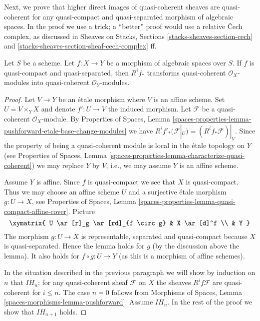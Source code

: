 \medskip\noindent
Next, we prove that higher direct images of quasi-coherent sheaves are
quasi-coherent for any quasi-compact and quasi-separated morphism of
algebraic spaces. In the proof we use a trick; a ``better'' proof would
use a relative {\v C}ech complex, as discussed in
Sheaves on Stacks, Sections \ref{stacks-sheaves-section-cech} and
\ref{stacks-sheaves-section-sheaf-cech-complex} ff.

\begin{lemma}
\label{lemma-higher-direct-image}
Let $S$ be a scheme. Let $f : X \to Y$ be a morphism of algebraic spaces
over $S$. If $f$ is quasi-compact and quasi-separated, then $R^if_*$
transforms quasi-coherent $\mathcal{O}_X$-modules into
quasi-coherent $\mathcal{O}_Y$-modules.
\end{lemma}

\begin{proof}
Let $V \to Y$ be an \'etale morphism where $V$ is an affine scheme. Set
$U = V \times_Y X$ and denote $f' : U \to V$ the induced morphism.
Let $\mathcal{F}$ be a quasi-coherent $\mathcal{O}_X$-module. By
Properties of Spaces, Lemma
\ref{spaces-properties-lemma-pushforward-etale-base-change-modules}
we have
$R^if'_*(\mathcal{F}|_U) = (R^if_*\mathcal{F})|_V$.
Since the property of being a quasi-coherent module is local in the
\'etale topology on $Y$ (see
Properties of Spaces, Lemma
\ref{spaces-properties-lemma-characterize-quasi-coherent})
we may replace $Y$ by $V$, i.e., we may assume $Y$ is an affine scheme.

\medskip\noindent
Assume $Y$ is affine. Since $f$ is quasi-compact we see that $X$
is quasi-compact. Thus we may choose an affine scheme $U$ and a surjective
\'etale morphism $g : U \to X$, see
Properties of Spaces,
Lemma \ref{spaces-properties-lemma-quasi-compact-affine-cover}.
Picture
$$
\xymatrix{
U \ar[r]_g \ar[rd]_{f \circ g} & X \ar[d]^f \\
& Y
}
$$
The morphism $g : U \to X$ is representable, separated
and quasi-compact because $X$ is quasi-separated. Hence the lemma
holds for $g$ (by the discussion above the lemma).
It also holds for $f \circ g : U \to Y$ (as this is a morphism
of affine schemes).

\medskip\noindent
In the situation described in the previous paragraph we will show by
induction on $n$ that $IH_n$: for any quasi-coherent sheaf $\mathcal{F}$
on $X$ the sheaves $R^if\mathcal{F}$
are quasi-coherent for $i \leq n$.
The case $n = 0$ follows from
Morphisms of Spaces, Lemma \ref{spaces-morphisms-lemma-pushforward}.
Assume $IH_n$. In the rest of the proof we show that $IH_{n + 1}$ holds.


\end{proof}
